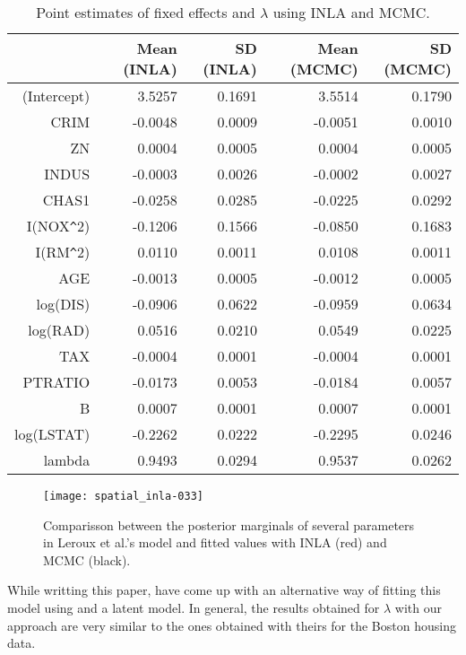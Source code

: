 \documentclass[article]{jss}
\begin{document}
\begin{table}[ht]
\centering
\begin{tabular}{rrrrr}
  \hline
 & Mean (INLA) & SD (INLA) & Mean (MCMC) & SD (MCMC) \\ 
  \hline
(Intercept) & 3.5257 & 0.1691 & 3.5514 & 0.1790 \\ 
  CRIM & -0.0048 & 0.0009 & -0.0051 & 0.0010 \\ 
  ZN & 0.0004 & 0.0005 & 0.0004 & 0.0005 \\ 
  INDUS & -0.0003 & 0.0026 & -0.0002 & 0.0027 \\ 
  CHAS1 & -0.0258 & 0.0285 & -0.0225 & 0.0292 \\ 
  I(NOX\verb|^|2) & -0.1206 & 0.1566 & -0.0850 & 0.1683 \\ 
  I(RM\verb|^|2) & 0.0110 & 0.0011 & 0.0108 & 0.0011 \\ 
  AGE & -0.0013 & 0.0005 & -0.0012 & 0.0005 \\ 
  log(DIS) & -0.0906 & 0.0622 & -0.0959 & 0.0634 \\ 
  log(RAD) & 0.0516 & 0.0210 & 0.0549 & 0.0225 \\ 
  TAX & -0.0004 & 0.0001 & -0.0004 & 0.0001 \\ 
  PTRATIO & -0.0173 & 0.0053 & -0.0184 & 0.0057 \\ 
  B & 0.0007 & 0.0001 & 0.0007 & 0.0001 \\ 
  log(LSTAT) & -0.2262 & 0.0222 & -0.2295 & 0.0246 \\ 
  lambda & 0.9493 & 0.0294 & 0.9537 & 0.0262 \\ 
   \hline
\end{tabular}
\caption{Point estimates of fixed effects and $\lambda$ using INLA and MCMC.} 
\label{tab:leroux}
\end{table}

\begin{figure}[h]
\begin{center}
\texttt{[image: spatial\_inla-033]}
\end{center}
\caption{Comparisson between the posterior marginals of several parameters in 
Leroux et al.'s model and fitted values with INLA (red) and MCMC (black).}
\label{fig:leroux}
\end{figure}

While writting this paper, \citet{LeeMitchell:2013} have come up with an
alternative way of fitting this model using  and a 
latent model. In general, the results obtained for $\lambda$ with our approach
are very similar to the ones obtained with theirs for the Boston housing data.
\end{document}
